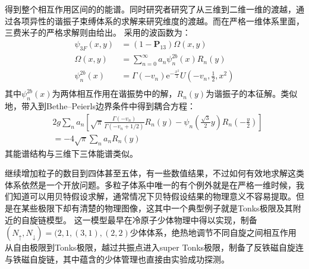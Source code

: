 得到整个相互作用区间的的能谱。同时研究者研究了从三维到二维一维的渡越\cite{blume2012}，通过各项异性的谐振子束缚体系的求解来研究维度的渡越。而在严格一维体系里面，三费米子的严格求解则由\cite{Rittenhouse2010green,d2014three,loft2015variational,andersen2016interpolatory,bellotti2017comparing}给出。
采用的波函数为：
\begin{equation}
\begin{split}
\psi_{3 F}(x, y)&=\left(1-\boldsymbol{P}_{13}\right) \Omega(x, y)\\
\Omega(x, y)&=\sum_{n=0}^{\infty} a_{n} \psi_{n}^{2b}(x) R_{n}(y)\\
\psi_{n}^{2b}(x)&=\Gamma\left(-v_{n}\right) \mathrm{e}^{-\frac{x^{2}}{2}} U\left(-v_{n}, \frac{1}{2}, x^{2}\right)\\
\end{split}
\end{equation}
其中$\psi_{n}^{2b}(x)$为两体相互作用在谐振势中的解，$R_{n}(y)$为谐振子的本征解。类似地，带入到Bethe–Peierls边界条件中得到耦合方程：
\begin{equation}
\begin{aligned}
&2 g \sum_{n} a_{n}\left[\sqrt{\pi} \frac{\Gamma\left(-v_{n}\right)}{\Gamma\left(-v_{n}+1 / 2\right)} R_{n}(y)-\psi_{n}\left(\frac{\sqrt{3}}{2} y\right) R_{n}\left(-\frac{y}{2}\right)\right] \\
&=-4 \sqrt{\pi} \sum_{n} a_{n} R_{n}(y)
\end{aligned}
\end{equation}
其能谱结构与三维下三体能谱类似。

\begin{comment}
相应地能谱如图~\ref{1d3b}~所示。
\begin{figure}[!htbp]
    \centering
    \texttt{[image: chap11d3b.png]}
    \bicaption{一维下三费米子体系$\uparrow \downarrow \uparrow$的能谱。摘自\citep{d2014three} }{Spectrum of three fermion system($\uparrow\downarrow\uparrow$ in 1D. Reprinted from \citep{d2014three}}
    \label{1d3b}
\end{figure}
\end{comment}

继续增加粒子的数目到四体甚至五体，有一些数值结果\cite{Blume2010,blume2012few}，不过如何有效地求解这类体系依然是一个开放问题。多粒子体系中唯一的有个例外就是在严格一维时候，我们知道可以用贝特假设求解，通常情况下贝特假设结果的物理意义不容易提取。但是在某些极限下却有清楚的物理图像，这其中一个典型例子就是Tonks极限及其附近的自旋链模型\cite{Guan2009exact,ma2009mathematical,Lewenstein2013spinchain,volosniev2014strongly,Busch013spinchain,CuiHo2014,Santos2014spinchain,Puhan2015spinchain,Yang2016effective}。
这一模型最早在冷原子少体物理中得以实现，制备$(N_\uparrow,N_\downarrow)=(2,1,(3,1),(2,2)$少体体系，绝热地调节不同自旋之间相互作用从自由极限到Tonks极限，越过共振点进入super Tonks极限，制备了反铁磁自旋连与铁磁自旋链，其中蕴含的少体管理也直接由实验成功探测\citep{MurmannSpinChain}。

